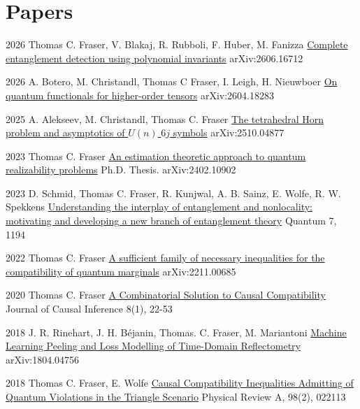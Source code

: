 \documentclass[10pt]{article}
\begin{document}
    \section{Papers}
    \begin{paperlist}
        \item{2026}
        {Thomas C. Fraser, V. Blakaj, R. Rubboli, F. Huber, M. Fanizza}
        {\href{https://arxiv.org/abs/2606.16712}{Complete entanglement detection using polynomial invariants}}
        {arXiv:2606.16712}
        \item{2026}
        {A. Botero, M. Christandl, Thomas C Fraser, I. Leigh, H. Nieuwboer}
        {\href{https://arxiv.org/abs/2604.18283}{On quantum functionals for higher-order tensors}}
        {arXiv:2604.18283}
        \item{2025}
        {A. Alekseev, M. Christandl, Thomas C. Fraser}
        {\href{https://arxiv.org/abs/2510.04877}{The tetrahedral Horn problem and asymptotics of $U(n)$ $6j$ symbols}}
        {arXiv:2510.04877}
        \item{2023}
        {Thomas C. Fraser}
        {\href{https://uwspace.uwaterloo.ca/items/91e64237-521a-4386-bb9e-caaf2cbc3eaa}{An estimation theoretic approach to quantum realizability problems}}
        {Ph.D. Thesis. arXiv:2402.10902}
        \item{2023}
        {D. Schmid, Thomas C. Fraser, R. Kunjwal, A. B. Sainz, E. Wolfe, R. W. Spekkens}
        {\href{https://arxiv.org/abs/2004.09194}{Understanding the interplay of entanglement and nonlocality: motivating and developing a new branch of entanglement theory}}
        {Quantum 7, 1194}
        \item{2022}
        {Thomas C. Fraser}
        {\href{https://arxiv.org/abs/2211.00685}{A sufficient family of necessary inequalities for the compatibility of quantum marginals}}
        {arXiv:2211.00685}
        \item{2020}
        {Thomas C. Fraser}
        {\href{https://www.degruyter.com/document/doi/10.1515/jci-2019-0013/html?lang=en}{A Combinatorial Solution to Causal Compatibility}}
        {Journal of Causal Inference 8(1), 22-53}
        \item{2018}
        {J. R. Rinehart, J. H. Béjanin, Thomas. C. Fraser, M. Mariantoni}
        {\href{https://arxiv.org/abs/1804.04756}{Machine Learning Peeling and Loss Modelling of Time-Domain Reflectometry}}
        {arXiv:1804.04756}
        \item{2018}
        {Thomas C. Fraser, E. Wolfe}
        {\href{https://journals.aps.org/pra/abstract/10.1103/PhysRevA.98.022113}{Causal Compatibility Inequalities Admitting of Quantum Violations in the Triangle Scenario}}
        {Physical Review A, 98(2), 022113}
    \end{paperlist}
\end{document}
